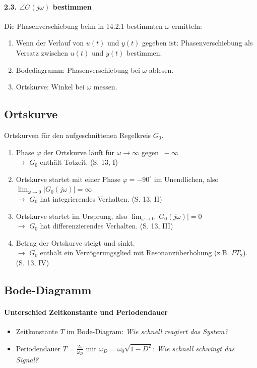\documentclass[12pt]{article}
\begin{document}
\paragraph{2.3.  \( \angle G(j\omega)\) bestimmen}
Die Phasenverschiebung beim in 14.2.1 bestimmten \(\omega\) ermitteln:
\begin{enumerate}
	\item Wenn der Verlauf von \(u(t)\) und \(y(t)\) gegeben ist: Phasenverschiebung als Versatz zwischen \(u(t)\) und \(y(t)\) bestimmen.
	\item Bodediagramm: Phasenverschiebung bei \(\omega\) ablesen.
	\item Ortskurve: Winkel bei \(\omega\) messen.
\end{enumerate}
\subsection{Ortskurve}
Ortskurven für den aufgeschnittenen Regelkreis \(G_0\).
\begin{enumerate}[label=\arabic*.]
	\item Phase \(\varphi\) der Ortskurve läuft für \(\omega \rightarrow \infty \) gegen \(\ - \infty\) \\
	\(\rightarrow\) \(G_0\) enthält Totzeit. (S. 13, I)
	\item Ortskurve startet mit einer Phase \(\varphi = -90 ^\circ \) im Unendlichen, also \(\lim_{\omega \to 0}|G_0(j \omega)| = \infty\) \\ \(\rightarrow\) \(G_0\) hat integrierendes Verhalten. (S. 13, II)
	\item Ortskurve startet im Ursprung, also \(\lim_{\omega \to 0}|G_0(j \omega)| = 0\) \\ \(\rightarrow\) \(G_0\) hat differenzierendes Verhalten. (S. 13, III)
	\item Betrag der Ortskurve steigt und sinkt.
	\\ \(\rightarrow\) \(G_0\) enthält ein Verzögerungsglied mit Resonanzüberhöhung (z.B. \(PT_2\)). (S. 13, IV)
	
\end{enumerate}
\subsection{Bode-Diagramm}
\paragraph{Unterschied Zeitkonstante und Periodendauer}
\begin{itemize}
	\item Zeitkonstante \(T\) im Bode-Diagram: \emph{Wie schnell reagiert das System?}
	\item Periodendauer \(T=\tfrac{2\pi}{\omega_D}\) mit \(\omega_D = \omega_0\sqrt{1-D^2}\): \emph{Wie schnell schwingt das Signal?}
\end{itemize}
\end{document}
